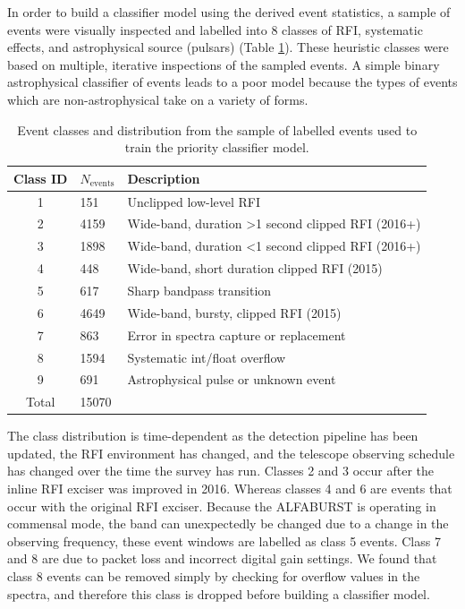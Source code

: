 \documentclass[a4paper,fleqn,usenatbib]{mnras}
\begin{document}
In order to build a classifier model using the derived event statistics, a
sample of events were visually inspected and labelled into 8 classes of RFI,
systematic effects, and astrophysical source (pulsars) (Table
\ref{tbl:event_classes}). These heuristic classes were based on multiple,
iterative inspections of the sampled events. A simple binary astrophysical
classifier of events leads to a poor model because the types of events which
are non-astrophysical take on a variety of forms.

\begin{table}
\centering
\begin{tabularx}{\linewidth}{clX}
\hline
Class ID & $N_{\textrm{events}}$ & Description                                     \\
\hline
1        & 151     & Unclipped low-level RFI                                       \\
2        & 4159    & Wide-band, duration \textgreater 1 second clipped RFI (2016+) \\
3        & 1898    & Wide-band, duration \textless 1 second clipped RFI (2016+)    \\
4        & 448     & Wide-band, short duration clipped RFI (2015)                  \\
5        & 617     & Sharp bandpass transition                                     \\
6        & 4649    & Wide-band, bursty, clipped RFI (2015)                         \\
7        & 863     & Error in spectra capture or replacement                       \\
8        & 1594    & Systematic int/float overflow                                 \\
9        & 691     & Astrophysical pulse or unknown event                          \\
\hline
Total    & 15070   &                                                              
\end{tabularx}
\caption{Event classes and distribution from the sample of labelled events used
to train the priority classifier model.}
\label{tbl:event_classes}
\end{table}

The class distribution is time-dependent as the detection pipeline has been
updated, the RFI environment has changed, and the telescope observing schedule
has changed over the time the survey has run. Classes 2 and 3 occur after the
inline RFI exciser was improved in 2016. Whereas classes 4 and 6 are events that
occur with the original RFI exciser. Because the ALFABURST is operating in
commensal mode, the band can unexpectedly be changed due to a change in the
observing frequency, these event windows are labelled as class 5 events. Class 7
and 8 are due to packet loss and incorrect digital gain settings. We found that
class 8 events can be removed simply by checking for overflow values in the
spectra, and therefore this class is dropped before building a classifier model.
\end{document}
